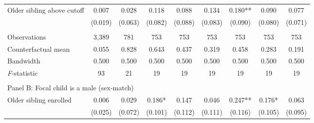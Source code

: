 \begin{table}[!htbp]
{{\begin{tabular}{lcccccccc}
Older sibling above cutoff&       0.007   &       0.028   &       0.118   &       0.088   &       0.134   &       0.180** &       0.090   &       0.077   \\
                    &     (0.019)   &     (0.063)   &     (0.082)   &     (0.088)   &     (0.083)   &     (0.090)   &     (0.080)   &     (0.071)   \\
                    &               &               &               &               &               &               &               &               \\
Observations        &       3,389   &         781   &         753   &         753   &         753   &         753   &         753   &         753   \\
Counterfactual mean &       0.055   &       0.828   &       0.643   &       0.437   &       0.319   &       0.458   &       0.283   &       0.191   \\
Bandwidth           &       0.500   &       0.500   &       0.500   &       0.500   &       0.500   &       0.500   &       0.500   &       0.500   \\
\textit{F}-statistic&          93   &          21   &          19   &          19   &          19   &          19   &          19   &          19   \\
 
&  &  &  & & & & & \\
\multicolumn{10}{l}{Panel B: Focal child is a male (sex-match)} \\
Older sibling enrolled&       0.006   &       0.029   &       0.186*  &       0.147   &       0.046   &       0.247** &       0.176*  &       0.063   \\
                    &     (0.025)   &     (0.072)   &     (0.101)   &     (0.112)   &     (0.111)   &     (0.116)   &     (0.105)   &     (0.095)   \\
 

\end{tabular}}}
\end{table}
